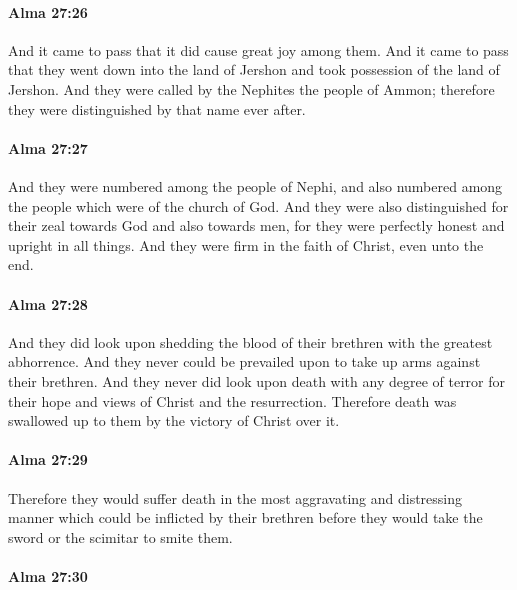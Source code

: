 		\paragraph{Alma 27:26} %
			\label{ALMA-27-26}

			And it came to pass that it did cause great joy among them.
			And it came to pass that they went down into the land of Jershon
			and took possession of the land of Jershon.
			And they were called by the Nephites the people of Ammon;
			therefore they were distinguished by that name ever after.

		\paragraph{Alma 27:27} %
			\label{ALMA-27-27}

			And they were numbered among the people of Nephi,
			and also numbered among the people which were of the church of God.
			And they were also distinguished for their zeal towards God and also towards men,
			for they were perfectly honest and upright in all things.
			And they were firm in the faith of Christ, even unto the end.

		\paragraph{Alma 27:28} %
			\label{ALMA-27-28}

			And they did look upon shedding the blood of their brethren
			with the greatest abhorrence.
			And they never could be prevailed upon to take up arms against their brethren.
			And they never did look upon death with any degree of terror
			for their hope and views of Christ and the resurrection.
			Therefore death was swallowed up to them by the victory of Christ over it.

		\paragraph{Alma 27:29} %
			\label{ALMA-27-29}

			Therefore they would suffer death in the most aggravating and distressing manner
			which could be inflicted by their brethren
			before they would take the sword or the scimitar to smite them.

		\paragraph{Alma 27:30} %
			\label{ALMA-27-30}

